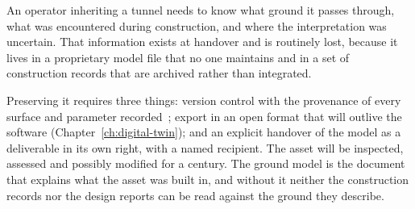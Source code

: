 An operator inheriting a tunnel needs to know what ground it passes through,
what was encountered during construction, and where the interpretation was
uncertain. That information exists at handover and is routinely lost, because
it lives in a proprietary model file that no one maintains and in a set of
construction records that are archived rather than integrated.

Preserving it requires three things: version control with the provenance of
every surface and parameter recorded~\citep{iso19650}; export in an open format that will
outlive the software (Chapter~\ref{ch:digital-twin}); and an explicit handover
of the model as a deliverable in its own right, with a named recipient. The
asset will be inspected, assessed and possibly modified for a century. The
ground model is the document that explains what the asset was built in, and
without it neither the construction records nor the design reports can be
read against the ground they describe.

\chapterreferences
